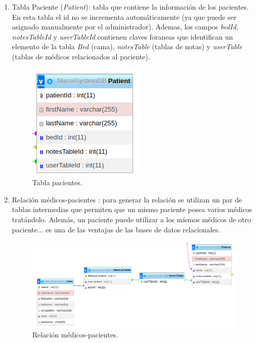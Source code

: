 \begin{enumerate}
\item Tabla Paciente (\textit{Patient}): tabla que contiene la información de los pacientes. En esta tabla el id no se incrementa automáticamente (ya que puede ser asignado manualmente por el administrador). Ademas, los campos \textit{bedId}, \textit{notesTableId} y \textit{userTableId} contienen claves foraneas que identifican un elemento de la tabla \textit{Bed} (cama), \textit{notesTable} (tablas de notas) y \textit{userTable} (tablas de médicos relacionados al paciente).


\begin{figure}[ht]
	\centering
	\includegraphics[scale=.6]{./Figures/dB(patient).png}
	\caption{Tabla pacientes.}
	\label{fig:Tabla pacientes (base de datos)}
\end{figure}


\item Relación médicos-pacientes : para generar la relación se utilizan un par de tablas intermedias que permiten que un mismo paciente posea varios médicos tratándolo. Además, un paciente puede utilizar a los mísmos médicos de otro paciente... es una de las ventajas de las bases de datos relacionales.


\begin{figure}[ht]
	\centering
	\includegraphics[scale=.45]{./Figures/tabla-medicos-pacientes.png}
	\caption{Relación médicos-pacientes.}
	\label{fig:Relación médicos-pacientes (base de datos)}
\end{figure}




\end{enumerate}
